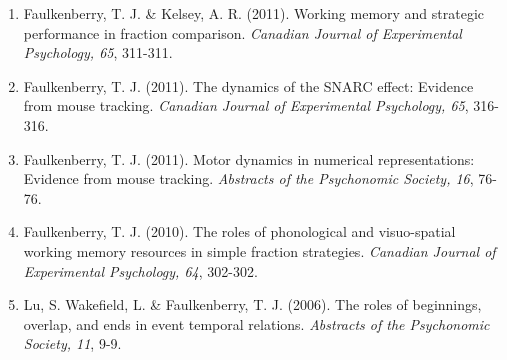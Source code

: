 \documentclass[article,10pt]{article}
\begin{document}
\begin{enumerate}
\item Faulkenberry, T. J. \& Kelsey, A. R. (2011). Working memory and strategic performance in fraction comparison. \emph{Canadian Journal of Experimental Psychology, 65}, 311-311.
\item Faulkenberry, T. J. (2011). The dynamics of the SNARC effect: Evidence from mouse tracking. \emph{Canadian Journal of Experimental Psychology, 65}, 316-316.
\item Faulkenberry, T. J. (2011). Motor dynamics in numerical representations: Evidence from mouse tracking. \emph{Abstracts of the Psychonomic Society, 16}, 76-76.
\item Faulkenberry, T. J. (2010). The roles of phonological and visuo-spatial working memory resources in simple fraction strategies. \emph{Canadian Journal of Experimental Psychology, 64}, 302-302.
\item Lu, S. Wakefield, L. \& Faulkenberry, T. J. (2006). The roles of beginnings, overlap, and ends in event temporal relations. \emph{Abstracts of the Psychonomic Society, 11}, 9-9.
\end{enumerate}
\end{document}
